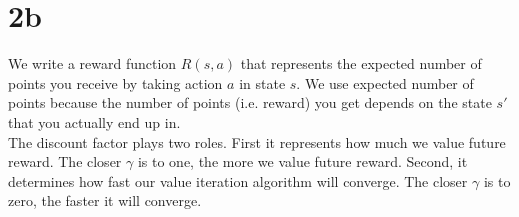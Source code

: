 \documentclass[12pt]{article}
\begin{document}
\section{2b}

We write a reward function $R(s, a)$ that represents the expected number of points you receive by taking action $a$ in state $s$. We use expected number of points because the number of points (i.e. reward) you get depends on the state $s'$ that you actually end up in. \\ 

The discount factor plays two roles. First it represents how much we value future reward. The closer $\gamma$ is to one, the more we value future reward. Second, it determines how fast our value iteration algorithm will converge. The closer $\gamma$ is to zero, the faster it will converge.
\end{document}

